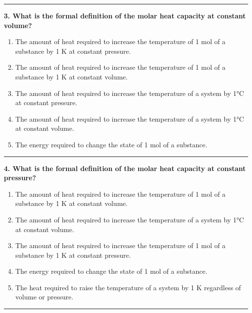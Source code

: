 \documentclass[
  9pt,
]{extbook}
\providecommand{\tightlist}{%
  \setlength{\itemsep}{0pt}\setlength{\parskip}{0pt}}
\theoremstyle{definition}
\theoremstyle{definition}
\theoremstyle{definition}
\theoremstyle{remark}
\begin{document}
\begin{center}\rule{0.5\linewidth}{0.5pt}\end{center}

\textbf{3. What is the formal definition of the molar heat capacity at constant volume?}

\begin{enumerate}
\def\labelenumi{\alph{enumi}.}
\tightlist
\item
  The amount of heat required to increase the temperature of 1 mol of a substance by 1 K at constant pressure.
\item
  The amount of heat required to increase the temperature of 1 mol of a substance by 1 K at constant volume.
\item
  The amount of heat required to increase the temperature of a system by 1°C at constant pressure.
\item
  The amount of heat required to increase the temperature of a system by 1°C at constant volume.
\item
  The energy required to change the state of 1 mol of a substance.
\end{enumerate}

\begin{center}\rule{0.5\linewidth}{0.5pt}\end{center}

\textbf{4. What is the formal definition of the molar heat capacity at constant pressure?}

\begin{enumerate}
\def\labelenumi{\alph{enumi}.}
\tightlist
\item
  The amount of heat required to increase the temperature of 1 mol of a substance by 1 K at constant volume.
\item
  The amount of heat required to increase the temperature of a system by 1°C at constant volume.
\item
  The amount of heat required to increase the temperature of 1 mol of a substance by 1 K at constant pressure.
\item
  The energy required to change the state of 1 mol of a substance.
\item
  The heat required to raise the temperature of a system by 1 K regardless of volume or pressure.
\end{enumerate}

\begin{center}\rule{0.5\linewidth}{0.5pt}\end{center}
\end{document}
